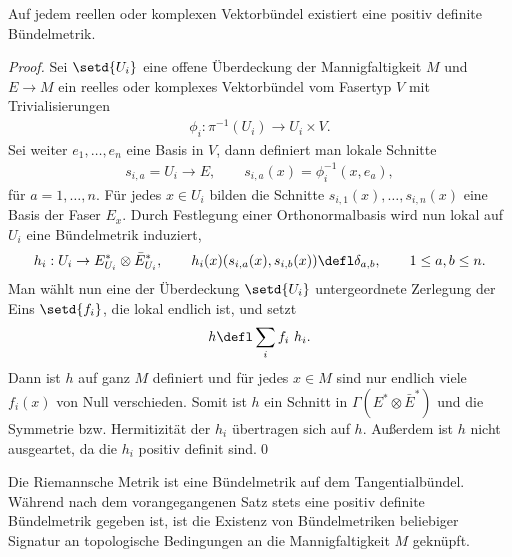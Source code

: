 \documentclass[%
	paper=a5,%
	fleqn,%
	DIV=18,%
	BCOR=0mm,
	fontsize=11pt,
	titlepage=false,%
	bibliography=totoc,
	DIV=18,%
	twoside=true,
	pdftitle=Riemannsche Geometrie,
	pdfauthor=Uwe Semmelmann,
	numbers=noendperiod]%
	{scrbook}
\begin{document}
\begin{prop}
Auf jedem reellen oder komplexen Vektorbündel existiert eine positiv definite
Bündelmetrik.\fish
\end{prop}
\begin{proof}
Sei $\setd{U_i}$ eine offene Überdeckung der Mannigfaltigkeit $M$ und
$E\to M$ ein reelles oder komplexes Vektorbündel vom Fasertyp $V$ mit
Trivialisierungen
\begin{align*}
\phi_i : \pi^{-1}(U_i) \to U_i\times V.
\end{align*}
Sei weiter $e_1,\ldots,e_n$ eine Basis in $V$, dann definiert man lokale
Schnitte
\begin{align*}
s_{i,a} = U_i\to E,\qquad s_{i,a}(x) = \phi_{i}^{-1}(x,e_a),
\end{align*}
für $a=1,\ldots,n$. Für jedes $x\in U_i$ bilden die Schnitte
$s_{i,1}(x),\ldots,s_{i,n}(x)$ eine Basis der Faser $E_x$. Durch Festlegung
einer Orthonormalbasis wird nun lokal auf $U_i$ eine Bündelmetrik induziert,
\begin{align*}
h_i : U_i\to E_{U_i}^*\otimes \bar{E}_{U_i}^*,\qquad
h_i(x)(s_{i,a}(x),s_{i,b}(x)) \defl \delta_{a,b},\qquad 1\le a,b\le n.
\end{align*}
Man wählt nun eine der Überdeckung $\setd{U_i}$ untergeordnete Zerlegung der
Eins $\setd{f_i}$, die lokal endlich ist, und setzt
\begin{align*}
h \defl \sum_{i} f_i\ h_i.
\end{align*}
Dann ist $h$ auf ganz $M$ definiert und für jedes $x\in M$ sind nur endlich
viele $f_i(x)$ von Null verschieden. Somit ist $h$ ein Schnitt in
$\Gamma(E^*\otimes \bar{E}^*)$ und die Symmetrie bzw. Hermitizität
der $h_i$ übertragen sich auf $h$. Außerdem ist $h$ nicht ausgeartet, da die
$h_i$ positiv definit sind.\qed
\end{proof}

\begin{ex}
Die Riemannsche Metrik ist eine Bündelmetrik auf dem Tangentialbündel. Während
nach dem vorangegangenen Satz stets eine positiv definite Bündelmetrik
gegeben ist, ist die Existenz von Bündelmetriken beliebiger Signatur an
topologische Bedingungen an die Mannigfaltigkeit $M$ geknüpft.\bsp
\end{ex}
\end{document}
